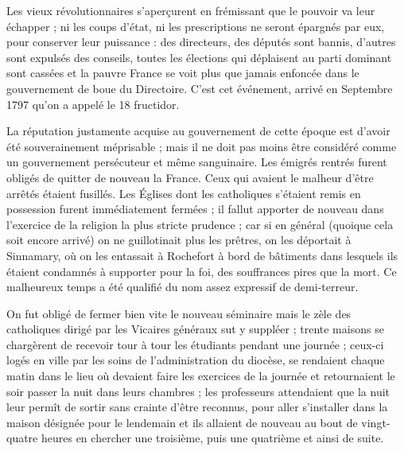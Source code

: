 \documentclass[11pt,a4paper]{report}
\begin{document}
Les vieux révolutionnaires s'aperçurent en frémissant que le pouvoir va leur échapper ; ni les coups d'état, ni les prescriptions ne seront épargnés par eux, pour conserver leur puissance : des directeurs, des députés sont bannis, d'autres sont expulsés des conseils, toutes les élections qui déplaisent au parti dominant sont cassées et la pauvre France se voit plus que jamais enfoncée dans le gouvernement de boue du Directoire. C'est cet événement, arrivé en Septembre 1797 qu'on a appelé le 18 fructidor.

La réputation justamente acquise au gouvernement de cette époque est d'avoir été souverainement méprisable ; mais il ne doit pas moins être considéré comme un gouvernement persécuteur et même sanguinaire. Les émigrés rentrés furent obligés de quitter de nouveau la France. Ceux qui avaient le malheur d'être arrêtés étaient fusillés. Les Églises dont les catholiques s'étaient remis en possession furent immédiatement fermées ; il fallut apporter de nouveau dans l'exercice de la religion la plus stricte prudence ; car si en général (quoique cela soit encore arrivé) on ne guillotinait plus les prêtres, on les déportait à Sinnamary, où on les entassait à Rochefort à bord de bâtiments dans lesquels ils étaient condamnés à supporter pour la foi, des souffrances pires que la mort. Ce malheureux temps a été qualifié du nom assez expressif de demi-terreur.

\vspace{0.3cm}\hrulefill\vspace{0.3cm}

On fut obligé de fermer bien vite le nouveau séminaire mais le zèle des catholiques dirigé par les Vicaires généraux sut y suppléer ; trente maisons se chargèrent de recevoir tour à tour les étudiants pendant une journée ; ceux-ci logés en ville par les soins de l'administration du diocèse, se rendaient chaque matin dans le lieu où devaient faire les exercices de la journée et retournaient le soir passer la nuit dans leurs chambres ; les professeurs attendaient que la nuit leur permît de sortir sans crainte d'être reconnus, pour aller s'installer dans la maison désignée pour le lendemain et ils allaient de nouveau au bout de vingt-quatre heures en chercher une troisième, puis une quatrième et ainsi de suite.
\end{document}
